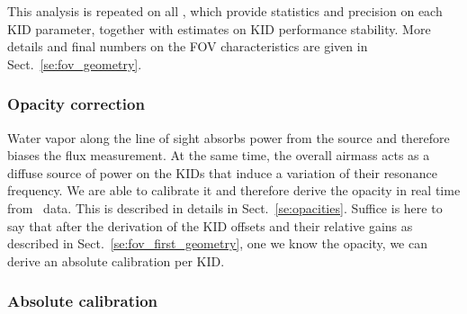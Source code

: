 
This analysis is repeated on all \bms, which provide statistics and
precision on each KID parameter, together with estimates on KID performance
stability. More details and final numbers on the FOV characteristics are given
in Sect.~\ref{se:fov_geometry}.

\subsubsection{Opacity correction}

Water vapor along the line of sight absorbs power from the source and therefore
biases the flux measurement. At the same time, the overall airmass acts as a
diffuse source of power on the KIDs that induce a variation of their resonance
frequency. We are able to calibrate it and therefore derive the opacity in real
time from \nika\ data. This is described in details in
Sect.~\ref{se:opacities}. Suffice is here to say that after the derivation of
the KID offsets and their relative gains as described in
Sect.~\ref{se:fov_first_geometry}, one we know the opacity, we can derive an
absolute calibration per KID.

\subsubsection{Absolute calibration}

